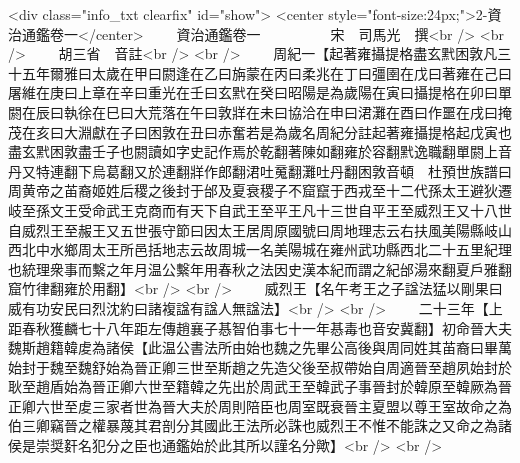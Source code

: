 <div class="info_txt clearfix" id="show">
<center style="font-size:24px;">2-資治通鑑卷一</center>
  　　資治通鑑卷一　　　　　宋　司馬光　撰<br />
<br />
　　胡三省　音註<br />
<br />
　　周紀一【起著雍攝提格盡玄黓困敦凡三十五年爾雅曰太歲在甲曰閼逢在乙曰旃蒙在丙曰柔兆在丁曰彊圉在戊曰著雍在己曰屠維在庚曰上章在辛曰重光在壬曰玄黓在癸曰昭陽是為歲陽在寅曰攝提格在卯曰單閼在辰曰執徐在巳曰大荒落在午曰敦牂在未曰協洽在申曰涒灘在酉曰作噩在戌曰掩茂在亥曰大淵獻在子曰困敦在丑曰赤奮若是為歲名周紀分註起著雍攝提格起戊寅也盡玄黓困敦盡壬子也閼讀如字史記作焉於乾翻著陳如翻雍於容翻黓逸職翻單閼上音丹又特連翻下烏葛翻又於連翻牂作郎翻涒吐䰟翻灘吐丹翻困敦音頓　杜預世族譜曰周黄帝之苖裔姬姓后稷之後封于邰及夏衰稷子不窟竄于西戎至十二代孫太王避狄遷岐至孫文王受命武王克商而有天下自武王至平王凡十三世自平王至威烈王又十八世自威烈王至赧王又五世張守節曰因太王居周原國號曰周地理志云右扶風美陽縣岐山西北中水鄉周太王所邑括地志云故周城一名美陽城在雍州武功縣西北二十五里紀理也統理衆事而繫之年月温公繫年用春秋之法因史漢本紀而謂之紀邰湯來翻夏戶雅翻窟竹律翻雍於用翻】<br />
<br />
　　威烈王【名午考王之子諡法猛以剛果曰威有功安民曰烈沈約曰諸複諡有諡人無諡法】<br />
<br />
　　二十三年【上距春秋獲麟七十八年距左傳趙襄子惎智伯事七十一年惎毒也音安冀翻】初命晉大夫魏斯趙籍韓䖍為諸侯【此温公書法所由始也魏之先畢公高後與周同姓其苖裔曰畢萬始封于魏至魏舒始為晉正卿三世至斯趙之先造父後至叔帶始自周適晉至趙夙始封於耿至趙盾始為晉正卿六世至籍韓之先出於周武王至韓武子事晉封於韓原至韓厥為晉正卿六世至䖍三家者世為晉大夫於周則陪臣也周室既衰晉主夏盟以尊王室故命之為伯三卿竊晉之權暴蔑其君剖分其國此王法所必誅也威烈王不惟不能誅之又命之為諸侯是崇奨姧名犯分之臣也通鑑始於此其所以謹名分歟】<br />
<br />
